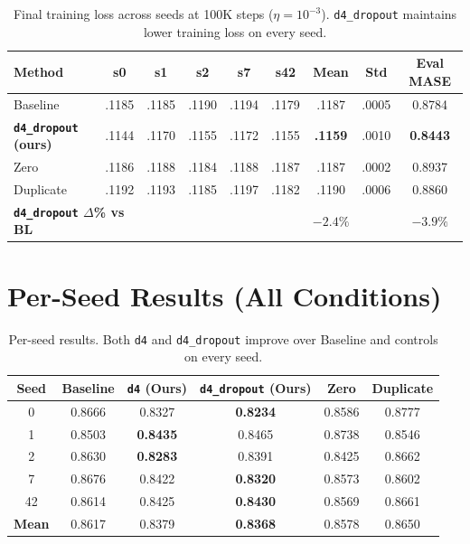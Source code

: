 \documentclass{article}
\begin{document}
\begin{table}[H]
\centering
\caption{Final training loss across seeds at 100K steps ($\eta = 10^{-3}$). \texttt{d4\_dropout} maintains lower training loss on every seed.}
\small
\begin{tabular}{lcccccccc}
\toprule
\textbf{Method} & \textbf{s0} & \textbf{s1} & \textbf{s2} & \textbf{s7} & \textbf{s42} & \textbf{Mean} & \textbf{Std} & \textbf{Eval MASE} \\
\midrule
Baseline & .1185 & .1185 & .1190 & .1194 & .1179 & .1187 & .0005 & 0.8784 \\
\textbf{\texttt{d4\_dropout} (ours)} & .1144 & .1170 & .1155 & .1172 & .1155 & \textbf{.1159} & .0010 & \textbf{0.8443} \\
Zero & .1186 & .1188 & .1184 & .1188 & .1187 & .1187 & .0002 & 0.8937 \\
Duplicate & .1192 & .1193 & .1185 & .1197 & .1182 & .1190 & .0006 & 0.8860 \\
\midrule
\multicolumn{2}{l}{\textbf{\texttt{d4\_dropout} $\Delta$\% vs BL}} & & & & & $-2.4\%$ & & $-3.9\%$ \\
\bottomrule
\end{tabular}
\end{table}

\section{Per-Seed Results (All Conditions)}
\label{app:seeds}

\begin{table}[H]
\centering
\caption{Per-seed results. Both \texttt{d4} and \texttt{d4\_dropout} improve over Baseline and controls on every seed.}
\small
\begin{tabular}{cccccc}
\toprule
\textbf{Seed} & \textbf{Baseline} & \textbf{\texttt{d4} (Ours)} & \textbf{\texttt{d4\_dropout} (Ours)} & \textbf{Zero} & \textbf{Duplicate} \\
\midrule
0 & 0.8666 & 0.8327 & \textbf{0.8234} & 0.8586 & 0.8777 \\
1 & 0.8503 & \textbf{0.8435} & 0.8465 & 0.8738 & 0.8546 \\
2 & 0.8630 & \textbf{0.8283} & 0.8391 & 0.8425 & 0.8662 \\
7 & 0.8676 & 0.8422 & \textbf{0.8320} & 0.8573 & 0.8602 \\
42 & 0.8614 & 0.8425 & \textbf{0.8430} & 0.8569 & 0.8661 \\
\midrule
\textbf{Mean} & 0.8617 & 0.8379 & \textbf{0.8368} & 0.8578 & 0.8650 \\
\bottomrule
\end{tabular}
\end{table}
\end{document}
